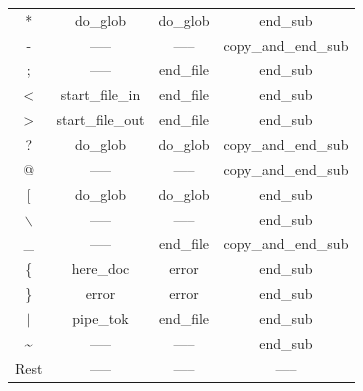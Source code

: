 \documentclass[12pt,a4paper]{report}
\begin{document}
\begin{table}[H]
\begin{tabular}{ |c|c|c|c| }
		* & do\_glob & do\_glob & end\_sub\cellcolor[HTML]{FFF49C} \\
		- & ----- & ----- &  copy\_and\_end\_sub \cellcolor[HTML]{FFF49C}\\
		; & ----- & end\_file\cellcolor[HTML]{BEE9F9} &  end\_sub \cellcolor[HTML]{FFF49C}\\
		< & start\_file\_in \cellcolor[HTML]{BEE9F9}& end\_file\cellcolor[HTML]{BEE9F9}&  end\_sub \cellcolor[HTML]{FFF49C}\\
		> & start\_file\_out \cellcolor[HTML]{BEE9F9}& end\_file \cellcolor[HTML]{BEE9F9}&  end\_sub \cellcolor[HTML]{FFF49C}\\
		? & do\_glob & do\_glob & copy\_and\_end\_sub \cellcolor[HTML]{FFF49C}\\
		@ & ----- & ----- & copy\_and\_end\_sub \cellcolor[HTML]{FFF49C}\\
		$[$ & do\_glob & do\_glob &  end\_sub \cellcolor[HTML]{FFF49C}\\
		$\backslash$ & ----- & ----- &  end\_sub \cellcolor[HTML]{FFF49C}\\
		\_ & ----- & end\_file \cellcolor[HTML]{BEE9F9}& copy\_and\_end\_sub \cellcolor[HTML]{FFF49C}\\
		\{ & here\_doc & error \cellcolor[HTML]{FF0044} &  end\_sub \cellcolor[HTML]{FFF49C}\\
		\} & error \cellcolor[HTML]{FF0044} & error \cellcolor[HTML]{FF0044} &  end\_sub \cellcolor[HTML]{FFF49C} \\
		$|$ & pipe\_tok & end\_file\cellcolor[HTML]{BEE9F9} &  end\_sub \cellcolor[HTML]{FFF49C}\\
		\textasciitilde  & ----- & ----- &  end\_sub \cellcolor[HTML]{FFF49C}\\
		Rest  & ----- & ----- &  ----- \\
		\hline
	\end{tabular}
\end{table}
\end{document}
